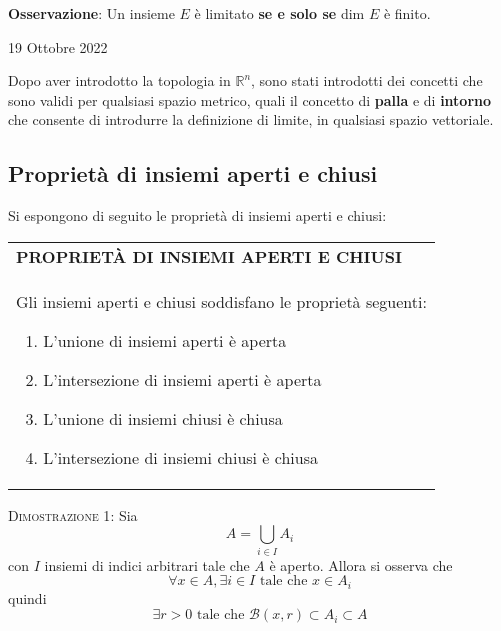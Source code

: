 \documentclass[a4paper]{extarticle}
\renewcommand\arraystretch{}
\begin{document}
\vspace{2em}
\noindent
\textbf{Osservazione}: Un insieme $E$ è limitato \textbf{se e solo se} dim $E$ è finito.

\newpage
\begin{center}
    19 Ottobre 2022
\end{center}
Dopo aver introdotto la topologia in $\mathbb{R}^n$, sono stati introdotti dei concetti che sono validi per qualsiasi spazio metrico, quali il concetto di \textbf{palla} e di \textbf{intorno} che consente di introdurre la definizione di limite, in qualsiasi spazio vettoriale.

\vspace{1em}
\noindent
\subsection{Proprietà di insiemi aperti e chiusi}
Si espongono di seguito le proprietà di insiemi aperti e chiusi:

\vspace{1em}
\setlength{\tabcolsep}{14pt}
\renewcommand{\arraystretch}{2}
\noindent
\begin{tabularx}{\textwidth}{@{}|P|@{}}
    \hline
    {\textbf{PROPRIETÀ DI INSIEMI APERTI E CHIUSI}}\\
    \parbox{\linewidth}{Gli insiemi aperti e chiusi soddisfano le proprietà seguenti:
    \begin{enumerate}
        \item L'unione di insiemi aperti è aperta
        \item L'intersezione di insiemi aperti è aperta
        \item L'unione di insiemi chiusi è chiusa
        \item L'intersezione di insiemi chiusi è chiusa
    \end{enumerate}
    \vspace{1mm}}\\
    \hline
\end{tabularx}

\vspace{2em}
\noindent
\normalfont \normalsize
\textsc{Dimostrazione 1}: Sia
\[A=\bigcup_{i \in I} A_i\]
con $I$ insiemi di indici arbitrari tale che $A$ è aperto. Allora si osserva che
\[\forall x \in A, \exists i \in I \text{ tale che } x \in A_i\]
quindi
\[\exists r > 0 \text{ tale che } \mathcal{B}(x,r) \subset A_i \subset A\]
\end{document}
